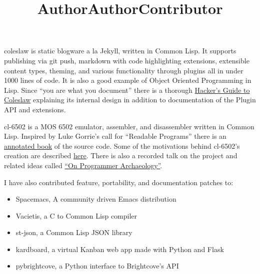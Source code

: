 \documentclass[margintitle,line]{res}
\begin{document}
\begin{resume}
\title{Author}
\begin{position}
  coleslaw is static blogware a la Jekyll, written in Common Lisp. It
  supports publishing via git push, markdown with code highlighting extensions,
  extensible content types, theming, and various functionality through plugins
  all in under 1000 lines of code. It is also a good example of Object Oriented
  Programming in Lisp. Since ``you are what you document'' there is a thorough
  \href{https://github.com/kingcons/coleslaw/blob/master/docs/hacking.md}{Hacker's Guide to Coleslaw}
  explaining its internal design in addition to documentation of the Plugin API
  and extensions.
\end{position}

\title{Author}
\begin{position}
  cl-6502 is a MOS 6502 emulator, assembler, and disassembler written in
  Common Lisp. Inspired by Luke Gorrie's call for ``Readable Programs'' there
  is an \href{http://redlinernotes.com/docs/cl-6502.pdf}{annotated book} of the
  source code.  Some of the motivations behind cl-6502's creation are described
  \href{https://blog.kingcons.io/posts/Towards-Comprehensible-Computing.html}{here}.
  There is also a recorded talk on the project and related ideas called
  \href{https://vimeo.com/redline6561/on-programmer-archaeology}{``On Programmer Archaeology''}.
\end{position}

\title{Contributor}
\dates{}
\begin{position}
  I have also contributed feature, portability, and documentation patches to:
  \begin{itemize}
    \item{Spacemacs, A community driven Emacs distribution}
    \item{Vacietis, a C to Common Lisp compiler}
    \item{st-json, a Common Lisp JSON library}
    \item{kardboard, a virtual Kanban web app made with Python and Flask}
    \item{pybrightcove, a Python interface to Brightcove's API}
  \end{itemize}
\end{position}



\end{resume}
\end{document}
